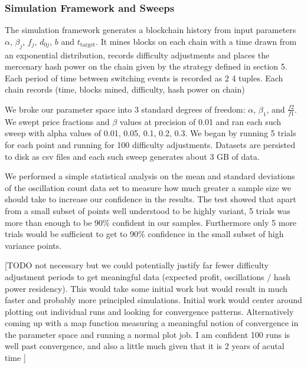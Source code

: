 \documentclass[10pt, preprint]{aastex}
\begin{document}
\subsubsection{Simulation Framework and Sweeps}
The simulation framework generates a blockchain history from input parameters $\alpha$, $\beta_j$, $f_j$, $d_{0j}$, $b$ and $t_{\text{target}}$.  It mines blocks on each chain with a time drawn from an exponential distribution, records difficulty adjustments and places the mercenary hash power on the chain given by the strategy defined in section 5.  Each period of time between switching events is recorded as 2 4 tuples.  Each chain records (time, blocks mined, difficulty, hash power on chain)

We broke our parameter space into 3 standard degrees of freedom: $\alpha$, $\beta_1$, and $\frac{f2}{f1}$.  We swept price fractions and $\beta$ values at precision of 0.01 and ran each such sweep with alpha values of 0.01, 0.05, 0.1, 0.2, 0.3.  We began by running 5 trials for each point and running for 100 difficulty adjustments.  Datasets are persisted to disk as csv files and each such sweep generates about 3 GB of data.

 We performed a simple statistical analysis on the mean and standard deviations of the oscillation count data set to measure how much greater a sample size we should take to increase our confidence in the results.  The test showed that apart from a small subset of points well understood to be highly variant, 5 trials was more than enough to be 90\% confident in our samples.  Furthermore only 5 more trials would be sufficient to get to 90\% confidence in the small subset of high variance points.

[TODO not necessary but we could potentially justify far fewer difficulty adjustment periods to get meaningful data (expected profit, oscillations / hash power residency).  This would take some initial work but would result in much faster and probably more principled simulations.  Initial work would center around plotting out individual runs and looking for convergence patterns.  Alternatively coming up with a map function measuring a meaningful notion of convergence in the parameter space and running a normal plot job.  I am confident 100 runs is well past convergence, and also a little much given that it is 2 years of acutal time ]
\end{document}
